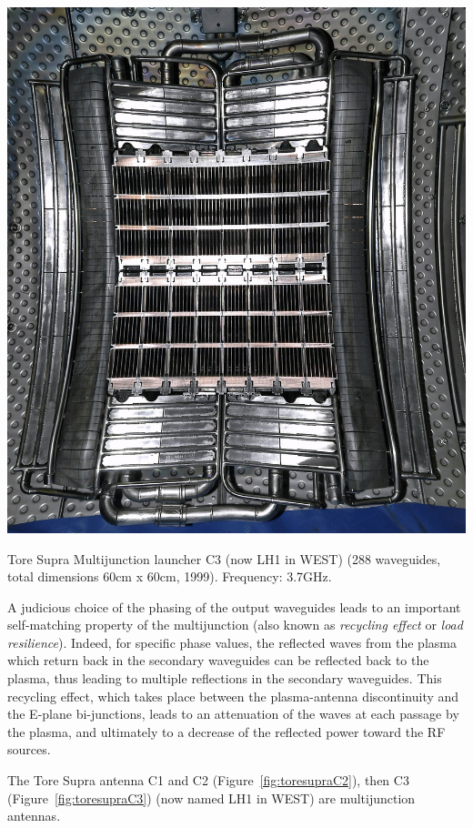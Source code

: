\begin{marginfigure}
	\centering
	\includegraphics[width=0.9\linewidth]{figures/chap3/ToreSupra_C3}
	\caption{Tore Supra Multijunction launcher C3 (now LH1 in WEST) (288 waveguides, total dimensions 60cm x 60cm, 1999). Frequency: 3.7GHz.}
	\label{fig:toresupraC3}
\end{marginfigure}

A judicious choice of the phasing of the output waveguides leads to an important self-matching property of the multijunction (also known as \emph{recycling effect} or \emph{load resilience}). Indeed, for specific phase values, the reflected waves from the plasma which return back in the secondary waveguides can be reflected back to the plasma, thus leading to multiple reflections in the secondary waveguides. This recycling effect, which takes place between the plasma-antenna discontinuity and the E-plane bi-junctions, leads to an attenuation of the waves at each passage by the plasma, and ultimately to a decrease of the reflected power toward the RF sources. 

The Tore Supra antenna C1 and C2 (Figure~\ref{fig:toresupraC2}), then C3 (Figure~\ref{fig:toresupraC3}) (now named LH1 in WEST) are multijunction antennas.




